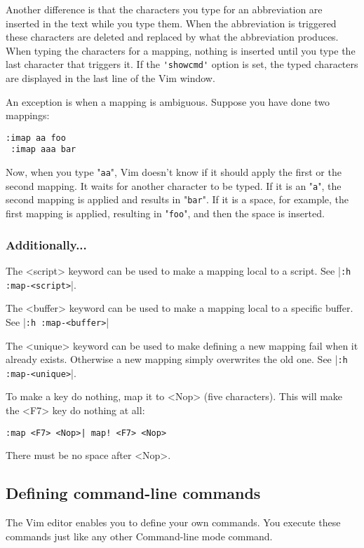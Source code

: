 Another difference is that the characters you type for an abbreviation are inserted in the text while you type them.
When the abbreviation is triggered these characters are deleted and replaced by what the abbreviation produces.
When typing the characters for a mapping, nothing is inserted until you type the last character that triggers it.
If the \verb!'showcmd'! option is set, the typed characters are displayed in the last line of the Vim window.

An exception is when a mapping is ambiguous.
Suppose you have done two mappings:

\begin{Verbatim}[samepage=true]
 :imap aa foo
 :imap aaa bar
\end{Verbatim}

Now, when you type "\verb!aa!", Vim doesn't know if it should apply the first or the second mapping.
It waits for another character to be typed.
If it is an "\verb!a!", the second mapping is applied and results in "\verb!bar!".
If it is a space, for example, the first mapping is applied, resulting in "\verb!foo!", and then the space is inserted.

\subsubsection{Additionally...}
The <script> keyword can be used to make a mapping local to a script.
See |\verb!:h :map-<script>!|.

The <buffer> keyword can be used to make a mapping local to a specific buffer.
See |\verb!:h :map-<buffer>!|

The <unique> keyword can be used to make defining a new mapping fail when it already exists.
Otherwise a new mapping simply overwrites the old one.
See |\verb!:h :map-<unique>!|.

To make a key do nothing, map it to <Nop> (five characters).
This will make the <F7> key do nothing at all:

\begin{Verbatim}[samepage=true]
 :map <F7> <Nop>| map! <F7> <Nop>
\end{Verbatim}

There must be no space after <Nop>.
\subsection{Defining command-line commands}
The Vim editor enables you to define your own commands.
You execute these commands just like any other Command-line mode command.

